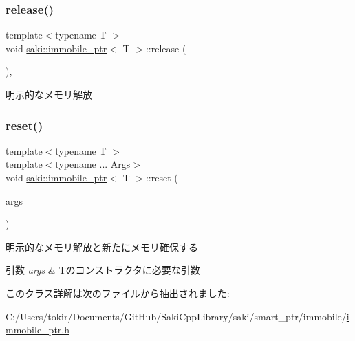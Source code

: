 \mbox{\label{classsaki_1_1immobile__ptr_a889ef4da216534edcf859d9da97e5955}} 
\subsubsection{\texorpdfstring{release()}{release()}}
{\footnotesize\ttfamily template$<$typename T $>$ \\
void \mbox{\hyperlink{classsaki_1_1immobile__ptr}{saki\+::immobile\+\_\+ptr}}$<$ T $>$\+::release (\begin{DoxyParamCaption}{ }\end{DoxyParamCaption})\hspace{0.3cm}{\ttfamily [inline]}, {\ttfamily [noexcept]}}



明示的なメモリ解放 

\mbox{\label{classsaki_1_1immobile__ptr_ad2e77d17881c8e10ba918f80fd9ad1cd}} 
\subsubsection{\texorpdfstring{reset()}{reset()}}
{\footnotesize\ttfamily template$<$typename T $>$ \\
template$<$typename ... Args$>$ \\
void \mbox{\hyperlink{classsaki_1_1immobile__ptr}{saki\+::immobile\+\_\+ptr}}$<$ T $>$\+::reset (\begin{DoxyParamCaption}\item[{Args ...}]{args }\end{DoxyParamCaption})\hspace{0.3cm}{\ttfamily [inline]}}



明示的なメモリ解放と新たにメモリ確保する 


\begin{DoxyParams}{引数}
{\em args} & Tのコンストラクタに必要な引数 \\
\hline
\end{DoxyParams}


このクラス詳解は次のファイルから抽出されました\+:\begin{DoxyCompactItemize}
\item 
C\+:/\+Users/tokir/\+Documents/\+Git\+Hub/\+Saki\+Cpp\+Library/saki/smart\+\_\+ptr/immobile/\mbox{\hyperlink{immobile__ptr_8h}{immobile\+\_\+ptr.\+h}}\end{DoxyCompactItemize}
